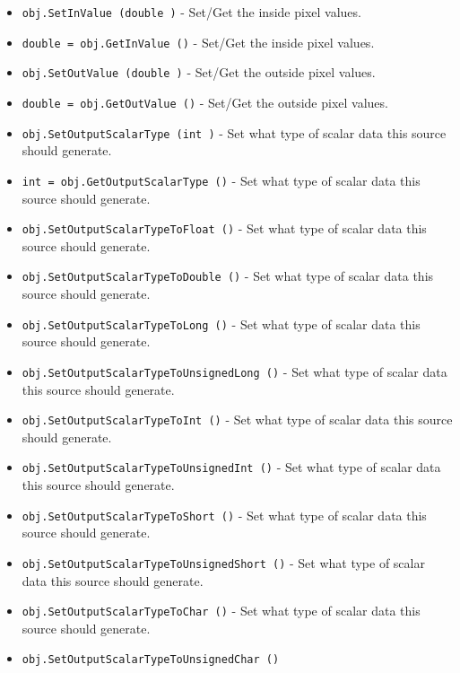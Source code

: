 \begin{itemize}
\item  \verb|obj.SetInValue (double )| -  Set/Get the inside pixel values.

\item  \verb|double = obj.GetInValue ()| -  Set/Get the inside pixel values.

\item  \verb|obj.SetOutValue (double )| -  Set/Get the outside pixel values.

\item  \verb|double = obj.GetOutValue ()| -  Set/Get the outside pixel values.

\item  \verb|obj.SetOutputScalarType (int )| -  Set what type of scalar data this source should generate.

\item  \verb|int = obj.GetOutputScalarType ()| -  Set what type of scalar data this source should generate.

\item  \verb|obj.SetOutputScalarTypeToFloat ()| -  Set what type of scalar data this source should generate.

\item  \verb|obj.SetOutputScalarTypeToDouble ()| -  Set what type of scalar data this source should generate.

\item  \verb|obj.SetOutputScalarTypeToLong ()| -  Set what type of scalar data this source should generate.

\item  \verb|obj.SetOutputScalarTypeToUnsignedLong ()| -  Set what type of scalar data this source should generate.

\item  \verb|obj.SetOutputScalarTypeToInt ()| -  Set what type of scalar data this source should generate.

\item  \verb|obj.SetOutputScalarTypeToUnsignedInt ()| -  Set what type of scalar data this source should generate.

\item  \verb|obj.SetOutputScalarTypeToShort ()| -  Set what type of scalar data this source should generate.

\item  \verb|obj.SetOutputScalarTypeToUnsignedShort ()| -  Set what type of scalar data this source should generate.

\item  \verb|obj.SetOutputScalarTypeToChar ()| -  Set what type of scalar data this source should generate.

\item  \verb|obj.SetOutputScalarTypeToUnsignedChar ()|

\end{itemize}
